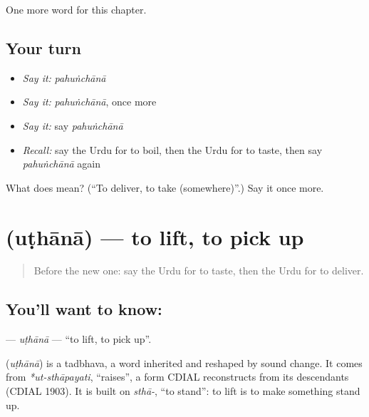 \begin{grammarlens}[title={What you've built}]
One more word for this chapter.
\end{grammarlens}

\subsection*{Your turn}
\begin{itemize}
\raggedright
  \item \emph{Say it:} \emph{pahuṅchānā}
  \item \emph{Say it:} \emph{pahuṅchānā}, once more
  \item \emph{Say it:} say \emph{pahuṅchānā}
  \item \emph{Recall:} say the Urdu for to boil, then the Urdu for to taste, then say \emph{pahuṅchānā} again
\end{itemize}

\begin{tcolorbox}[breakable,colback=teal!4,colframe=teal!35!black,title={Before you move on}]
What does  mean? (\textquotedblleft{}To deliver, to take (somewhere)\textquotedblright{}.) Say it once more.
\end{tcolorbox}
\section[\texorpdfstring{\ur{اٹھانا} (uṭhānā)}{اٹھانا (uṭhānā)}]{ (uṭhānā) — to lift, to pick up}

\label{lesson:UR-C213-uthana}



\begin{quote}
Before the new one: say the Urdu for to taste, then the Urdu for to deliver.
\end{quote}

\subsection*{You'll want to know: }
\textbf{} — \emph{uṭhānā} — \textquotedblleft{}to lift, to pick up\textquotedblright{}.

\begin{cousinweb}
\textbf{} (\emph{uṭhānā}) is a tadbhava, a word inherited and reshaped by sound change. It comes from \emph{*ut-sthāpayati}, \textquotedblleft{}raises\textquotedblright{}, a form CDIAL reconstructs from its descendants (CDIAL 1903). It is built on \emph{sthā-}, \textquotedblleft{}to stand\textquotedblright{}: to lift is to make something stand up.
\end{cousinweb}

